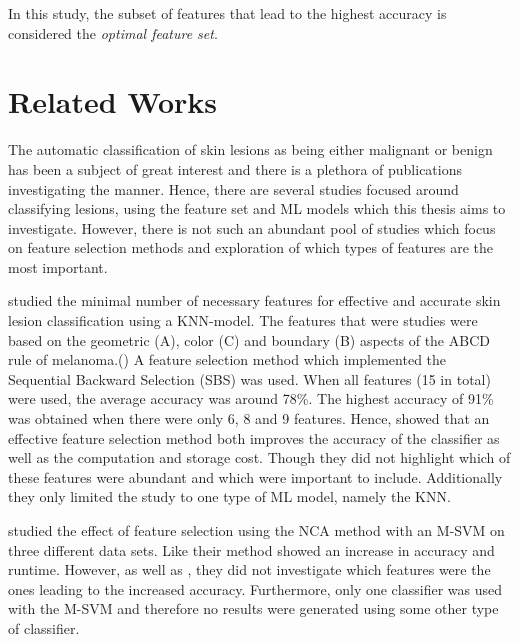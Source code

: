 \documentclass{kththesis}
\begin{document}
In this study, the subset of features that lead to the highest accuracy is considered the \emph{optimal feature set}.


\section{Related Works}


The automatic classification of skin lesions as being either malignant or benign has been a subject of great interest and there is a plethora of publications investigating the manner. Hence, there are several studies focused around classifying lesions, using the feature set and ML models which this thesis aims to investigate. However, there is not such an abundant pool of studies which focus on feature selection methods and exploration of which types of features are the most important. 

\parencite{MustafaSuleiman2017Fsus} studied the minimal number of necessary features for effective and accurate skin lesion classification using a KNN-model.  The features that were studies were based on the geometric (A), color (C)  and boundary (B) aspects of the ABCD rule of melanoma.(\parencite{MustafaSuleiman2017Fsus}) A feature selection method which implemented the Sequential Backward Selection (SBS) was used. When all features (15 in total) were used, the average accuracy was around 78\%. The highest accuracy of 91\% was obtained when there were only 6, 8 and 9 features. Hence, \parencite{MustafaSuleiman2017Fsus} showed that an effective feature selection method both improves the accuracy of the classifier as well as the computation and storage cost. Though they did not highlight which of these features were abundant and which were important to include. Additionally they only limited the study to one type of ML model, namely the KNN. 

\parencite{MustafaSuleiman2017Fsus} studied the effect of feature selection using the NCA method with an M-SVM on three different data sets. Like \parencite{MustafaSuleiman2017Fsus} their method showed an increase in accuracy and runtime. However, as well as \parencite{MustafaSuleiman2017Fsus}, they did not investigate which features were the ones leading to the increased accuracy. Furthermore, only one classifier was used with the M-SVM and therefore no results were generated using some other type of classifier. 
\end{document}
